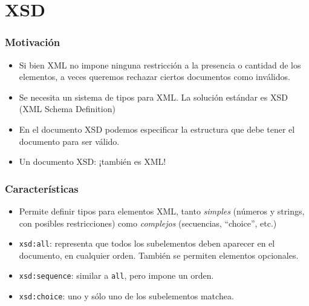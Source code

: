 \section{XSD}

\begin{frame}
\frametitle{Motivación}
\begin{itemize}
\item	Si bien XML no impone ninguna restricción a la presencia o cantidad
	de los elementos, a veces queremos rechazar ciertos documentos
	como inválidos.
	\pause

\item	Se necesita un sistema de tipos para XML. La solución
	estándar es XSD (XML Schema Definition)
	\pause

\item	En el documento XSD podemos especificar la estructura que
	debe tener el documento para ser válido.
	\pause

\item	Un documento XSD: ¡también es XML!
\end{itemize}
\end{frame}

\begin{frame}
\frametitle{Características}
\begin{itemize}
\item	Permite definir tipos para elementos XML, tanto {\it simples}
	(números y strings, con posibles restricciones) como
	{\it complejos} (secuencias, ``choice'', etc.)
	\pause

\item	\texttt{xsd:all}: representa que todos los subelementos
	deben aparecer en el documento, en cualquier orden. También
	se permiten elementos opcionales.
	\pause

\item	\texttt{xsd:sequence}: similar a \texttt{all}, pero impone
	un orden.
	\pause

\item	\texttt{xsd:choice}: uno y sólo uno de los subelementos
	matchea.
\end{itemize}
\end{frame}

